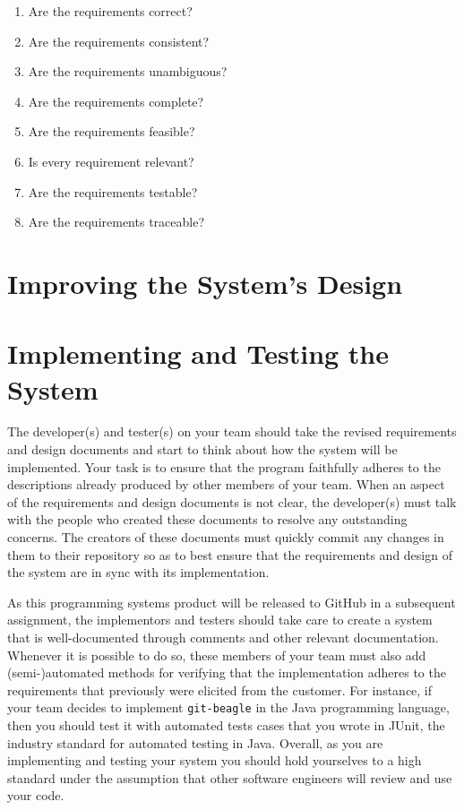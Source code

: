 \begin{enumerate}

  \itemsep 0in

  \item Are the requirements correct?
  \item Are the requirements consistent?
  \item Are the requirements unambiguous?
  \item Are the requirements complete?
  \item Are the requirements feasible?
  \item Is every requirement relevant?
  \item Are the requirements testable?
  \item Are the requirements traceable?

\end{enumerate}

\section*{Improving the System's Design}


\section*{Implementing and Testing the System}

The developer(s) and tester(s) on your team should take the revised requirements and design documents and start to think
about how the system will be implemented. Your task is to ensure that the program faithfully adheres to the descriptions
already produced by other members of your team. When an aspect of the requirements and design documents is not clear,
the developer(s) must talk with the people who created these documents to resolve any outstanding concerns. The creators
of these documents must quickly commit any changes in them to their repository so as to best ensure that the
requirements and design of the system are in sync with its implementation.

As this programming systems product will be released to GitHub in a subsequent assignment, the implementors and testers
should take care to create a system that is well-documented through comments and other relevant documentation. Whenever
it is possible to do so, these members of your team must also add (semi-)automated methods for verifying that the
implementation adheres to the requirements that previously were elicited from the customer. For instance, if your team
decides to implement {\tt git-beagle} in the Java programming language, then you should test it with automated tests
cases that you wrote in JUnit, the industry standard for automated testing in Java. Overall, as you are implementing and
testing your system you should hold yourselves to a high standard under the assumption that other software engineers
will review and use your code.

